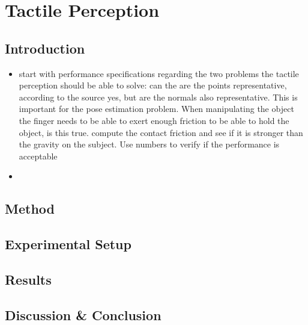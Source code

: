 \chapter{Tactile Perception} \label{ch:1-tactile-perception}

\section{Introduction} \label{sec:1-tactile-perception-introduction}

\begin{itemize}
	\item start with performance specifications regarding the two problems the tactile perception should be able to solve: can the are the points representative, according to the source yes, but are the normals also representative. This is important for the pose estimation problem. When manipulating the object the finger needs to be able to exert enough friction to be able to hold the object, is this true. compute the contact friction and see if it is stronger than the gravity on the subject. Use numbers to verify if the performance is acceptable
	\item 
\end{itemize}


\section{Method}\label{sec:1-tactile-perception-method}


\section{Experimental Setup}\label{sec:1-tactile-perception-experimental-setup}


\section{Results}\label{sec:1-tactile-perception-results}


\section{Discussion \& Conclusion}\label{sec:1-tactile-perception-discussion-and-conclusion}




